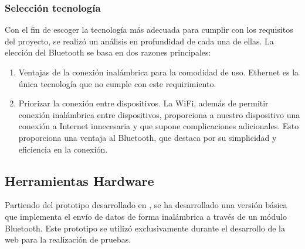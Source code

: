 \subsubsection{Selección tecnología}
Con el fin de escoger la tecnología más adecuada para cumplir con los requisitos del proyecto, se realizó un análisis en profundidad de cada una de ellas. La elección del Bluetooth se basa en dos razones principales:
\begin{enumerate}
    \item Ventajas de la conexión inalámbrica para la comodidad de uso. Ethernet es la única tecnología que no cumple con este requirimiento.
    \item Priorizar la conexión entre dispositivos. La WiFi, además de permitir conexión inalámbrica entre dispositivos, proporciona a nuestro dispositivo una conexión a Internet innecesaria y que supone complicaciones adicionales. Esto proporciona una ventaja al Bluetooth, que destaca por su simplicidad y eficiencia en la conexión.
\end{enumerate}

\subsection{Herramientas Hardware}
Partiendo del prototipo desarrollado en \cite{saragonz91:online}, se ha desarrollado una versión básica que implementa el envío de datos de forma inalámbrica a través de un módulo Bluetooth. Este prototipo se utilizó exclusivamente durante el desarrollo de la web para la realización de pruebas.

